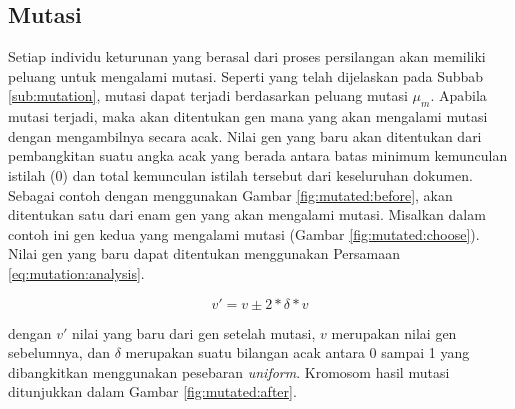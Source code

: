 \subsection{Mutasi}
Setiap individu keturunan yang berasal dari proses persilangan akan memiliki peluang untuk mengalami mutasi. Seperti yang telah dijelaskan pada Subbab \ref{sub:mutation}, mutasi dapat terjadi berdasarkan peluang mutasi $\mu_m$. Apabila mutasi terjadi, maka akan ditentukan gen mana yang akan mengalami mutasi dengan mengambilnya secara acak. Nilai gen yang baru akan ditentukan dari pembangkitan suatu angka acak yang berada antara batas minimum kemunculan istilah (0) dan total kemunculan istilah tersebut dari keseluruhan dokumen. Sebagai contoh dengan menggunakan Gambar \ref{fig:mutated:before}, akan ditentukan satu dari enam gen yang akan mengalami mutasi. Misalkan dalam contoh ini gen kedua yang mengalami mutasi (Gambar \ref{fig:mutated:choose}). Nilai gen yang baru dapat ditentukan menggunakan Persamaan \ref{eq:mutation:analysis}. 

\begin{equation}
	\label{eq:mutation:analysis}
	v'=v\pm 2*\delta*v
\end{equation}

dengan $v'$ nilai yang baru dari gen setelah mutasi, $v$ merupakan nilai gen sebelumnya, dan $\delta$ merupakan suatu bilangan acak antara 0 sampai 1 yang dibangkitkan menggunakan pesebaran \textit{uniform}. Kromosom hasil mutasi ditunjukkan dalam Gambar \ref{fig:mutated:after}.

